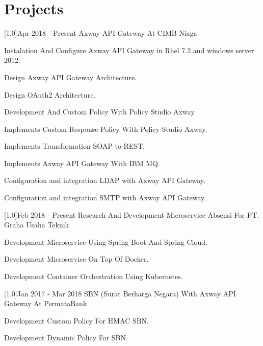 \documentclass[english]{cv-style}
\begin{document}
\section{Projects}
\vspace{-0.3cm}
\begin{entrylist}
\entry
{\scalebox{.6}[1.0]{Apr 2018 - Present}}
{Axway API Gateway At CIMB Niaga}
{}
{\vspace{-0.3cm}
  \begin{itemize}\small{
    \item Instalation And Configure Axway API Gateway in Rhel 7.2 and windows server 2012.
    \item Design Axway API Gateway Architecture.
    \item Design OAuth2 Architecture.
    \item Development And Custom Policy With Policy Studio Axway.
    \item Implements Custom Response Policy With Policy Studio Axway.
    \item Implements Transformation SOAP to REST.
    \item Implements Axway API Gateway With IBM MQ.
    \item Configuration and integration LDAP with Axway API Gateway.
    \item Configuration and integration SMTP with Axway API Gateway.}
  \end{itemize}}
\entry
{\scalebox{.6}[1.0]{Feb 2018 - Present}}
{Research And Development Microservice Absensi For PT. Graha Usaha Teknik}
{}
{\vspace{-0.3cm}
  \begin{itemize}\small{
    \item Development Microservice Using Spring Boot And Spring Cloud.
    \item Development Microservice On Top Of Docker.
    \item Development Container Orchestration Using Kubernetes.}
  \end{itemize}}
\entry
{\scalebox{.6}[1.0]{Jan 2017 - Mar 2018}}
{SBN (Surat Berharga Negara) With Axway API Gateway At PermataBank}
{}
{\vspace{-0.3cm}
  \begin{itemize}\small{
    \item Development Custom Policy For HMAC SBN.
    \item Development Dynamic Policy For SBN.
}
\end{itemize}}
\end{entrylist}
\end{document}
